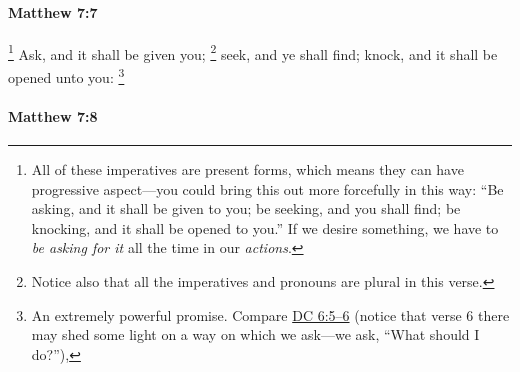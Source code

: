 		\paragraph{Matthew 7:7} %
			\label{MATTHEW-7-7}

				\footnote{%
					All of these imperatives are present forms, which means they can have progressive aspect---you could bring this out more forcefully in this way: ``Be asking, and it shall be given to you; be seeking, and you shall find; be knocking, and it shall be opened to you.'' If we desire something, we have to \textit{be asking for it} all the time in our \textit{actions}.
					}%
			Ask, and it shall be given you;%
				\footnote{%
					Notice also that all the imperatives and pronouns are plural in this verse.
					}
			seek, and ye shall find; knock, and it shall be opened unto you:%
				\footnote{%
					An extremely powerful promise. Compare \hyperref[DC6-5]{DC 6:5--6} (notice that verse 6 there may shed some light on a way on which we ask---we ask, ``What should I do?''), 
					}

			\begin{framed}
			\scriptsize
				\begin{compactdesc}
					\item[SBLG] 
				\end{compactdesc}
			\end{framed}

		\paragraph{Matthew 7:8} %
			\label{MATTHEW-7-8}

